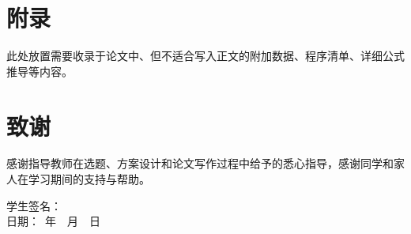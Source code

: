 \documentclass[\HNTcategory]{hntouthesis}
\begin{document}
\newpage
\begingroup
\renewcommand{\bibsection}{%
  \phantomsection
  \addcontentsline{toc}{section}{参考文献}%
  \begin{center}\hei\zihao{3}参考文献\end{center}
  \vspace{0.5\baselineskip}%
}
\renewcommand{\bibfont}{\song\zihao{5}}


\endgroup

\newpage
\section*{附\quad 录}
{\song{}\linespread{1.0}\selectfont
此处放置需要收录于论文中、但不适合写入正文的附加数据、程序清单、详细公式推导等内容。

}

\newpage
\section*{致\quad 谢}
感谢指导教师在选题、方案设计和论文写作过程中给予的悉心指导，感谢同学和家人在学习期间的支持与帮助。

\vspace{2cm}
\begin{flushright}
学生签名：\underline{\makebox[3cm]{}}\\[1.2em]
日\quad 期：\underline{\makebox[3cm]{}}\ 年\ \underline{\makebox[1cm]{}}\ 月\ \underline{\makebox[1cm]{}}\ 日
\end{flushright}
\fi
\fi
\end{document}
